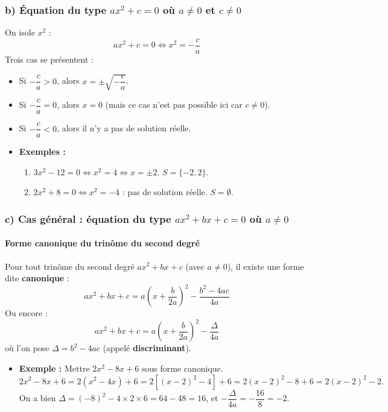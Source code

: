 \documentclass[12pt,a4paper]{article}
\newcounter{solution}
\begin{document}
\subsubsection*{\color{myred} b) Équation du type $ax^2 + c = 0$ où $a \neq 0$ et $c \neq 0$}
On isole $x^2$ :
\[
ax^2 + c = 0 \iff x^2 = -\frac{c}{a}
\]
Trois cas se présentent :
\begin{itemize}
    \item Si $-\dfrac{c}{a} > 0$, alors $x = \pm \sqrt{-\dfrac{c}{a}}$.
    \item Si $-\dfrac{c}{a} = 0$, alors $x = 0$ (mais ce cas n'est pas possible ici car $c \neq 0$).
    \item Si $-\dfrac{c}{a} < 0$, alors il n'y a pas de solution réelle.
\end{itemize}

\begin{itemize}
    \item \textbf{Exemples :}
    \begin{enumerate}[label=\arabic*)]
        \item $3x^2 - 12 = 0 \iff x^2 = 4 \iff x = \pm 2$. \quad $S = \{-2, 2\}$.
        \item $2x^2 + 8 = 0 \iff x^2 = -4$ : pas de solution réelle. \quad $S = \emptyset$.
    \end{enumerate}
\end{itemize}

\subsubsection*{\color{myred} c) Cas général : équation du type $ax^2 + bx + c = 0$ où $a \neq 0$}

\paragraph*{\color{myred} Forme canonique du trinôme du second degré}
Pour tout trinôme du second degré $ax^2 + bx + c$ (avec $a \neq 0$), il existe une forme dite \textbf{canonique} :
\[
ax^2 + bx + c = a\left(x + \dfrac{b}{2a}\right)^2 - \dfrac{b^2 - 4ac}{4a}
\]
Ou encore :
\[
ax^2 + bx + c = a\left(x + \dfrac{b}{2a}\right)^2 - \dfrac{\Delta}{4a}
\]
où l'on pose $\Delta = b^2 - 4ac$ (appelé \textbf{discriminant}).

\begin{itemize}
    \item \textbf{Exemple :} Mettre $2x^2 - 8x + 6$ sous forme canonique.
    \[
    2x^2 - 8x + 6 = 2(x^2 - 4x) + 6 = 2\left[(x-2)^2 - 4\right] + 6
    = 2(x-2)^2 - 8 + 6 = 2(x-2)^2 - 2.
    \]
    On a bien $\Delta = (-8)^2 - 4 \times 2 \times 6 = 64 - 48 = 16$, et $-\dfrac{\Delta}{4a} = -\dfrac{16}{8} = -2$.
\end{itemize}
\end{document}
